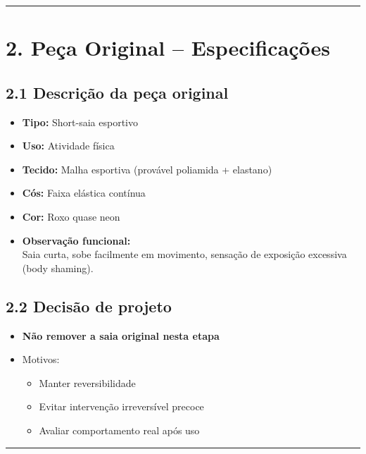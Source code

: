 \documentclass[
  10pt,oneside]{article}
\providecommand{\tightlist}{%
  \setlength{\itemsep}{0pt}\setlength{\parskip}{0pt}}
\begin{document}
\begin{center}\rule{0.5\linewidth}{0.5pt}\end{center}

\section{2. Peça Original -- Especificações}\label{peuxe7a-original-especificauxe7uxf5es}

\subsection{2.1 Descrição da peça original}\label{descriuxe7uxe3o-da-peuxe7a-original}

\begin{itemize}
\tightlist
\item
  \textbf{Tipo:} Short-saia esportivo
\item
  \textbf{Uso:} Atividade física
\item
  \textbf{Tecido:} Malha esportiva (provável poliamida + elastano)
\item
  \textbf{Cós:} Faixa elástica contínua
\item
  \textbf{Cor:} Roxo quase neon
\item
  \textbf{Observação funcional:}\\
  Saia curta, sobe facilmente em movimento, sensação de exposição excessiva (body shaming).
\end{itemize}

\subsection{2.2 Decisão de projeto}\label{decisuxe3o-de-projeto}

\begin{itemize}
\tightlist
\item
  \textbf{Não remover a saia original nesta etapa}
\item
  Motivos:

  \begin{itemize}
  \tightlist
  \item
    Manter reversibilidade
  \item
    Evitar intervenção irreversível precoce
  \item
    Avaliar comportamento real após uso
  \end{itemize}
\end{itemize}

\begin{center}\rule{0.5\linewidth}{0.5pt}\end{center}
\end{document}
